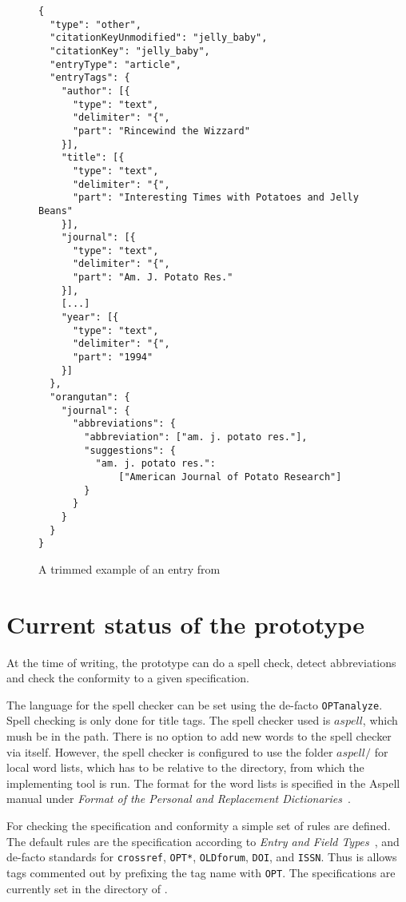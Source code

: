 \begin{figure}
  \centering
\begin{verbatim}
{
  "type": "other",
  "citationKeyUnmodified": "jelly_baby",
  "citationKey": "jelly_baby",
  "entryType": "article",
  "entryTags": {
    "author": [{
      "type": "text",
      "delimiter": "{",
      "part": "Rincewind the Wizzard"
    }],
    "title": [{
      "type": "text",
      "delimiter": "{",
      "part": "Interesting Times with Potatoes and Jelly Beans"
    }],
    "journal": [{
      "type": "text",
      "delimiter": "{",
      "part": "Am. J. Potato Res."
    }],
    [...]
    "year": [{
      "type": "text",
      "delimiter": "{",
      "part": "1994"
    }]
  },
  "orangutan": {
    "journal": {
      "abbreviations": {
        "abbreviation": ["am. j. potato res."],
        "suggestions": {
          "am. j. potato res.":
              ["American Journal of Potato Research"]
        }
      }
    }
  }
}
\end{verbatim}
\caption{A trimmed example of an entry from {\orangutan} }
\label{fig:orgazing_complete}
\end{figure}

\section{Current status of the prototype}

At the time of writing, the prototype can do a spell check, detect
abbreviations and check the conformity to a given specification.

The language for the spell checker can be set using the de-facto
\texttt{OPTanalyze}.  Spell checking is only done for title tags.  The
spell checker used is $aspell$, which mush be in the path.  There is
no option to add new words to the spell checker via {\orangutan}
itself.  However, the spell checker is configured to use the folder
$aspell/$ for local word lists, which has to be relative to the
directory, from which the implementing tool is run.  The format for
the word lists is specified in the Aspell manual under \emph{Format of
  the Personal and Replacement Dictionaries}~\cite{format2016_aspell}.

For checking the specification and conformity a simple set of rules
are defined.  The default rules are the {\bibtex} specification
according to \emph{{\bibtex} Entry and Field
  Types}~\cite{bibtex_roberts}, and de-facto standards for
\texttt{crossref}, \texttt{OPT*}, \texttt{OLDforum}, \texttt{DOI}, and
\texttt{ISSN}.  Thus is allows tags commented out by prefixing the tag
name with \texttt{OPT}.  The specifications are currently set in the
directory of {\orangutan}.

